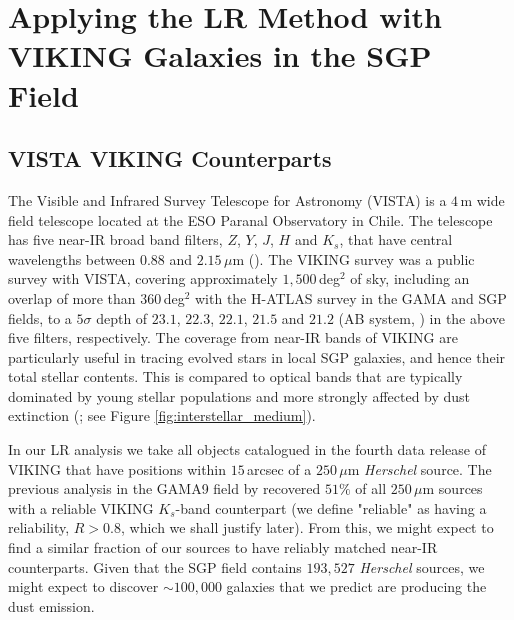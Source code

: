 \section{Applying the LR Method with VIKING Galaxies in the SGP Field}
\subsection{VISTA VIKING Counterparts}
\label{sec:star_galaxy_classifier}

The Visible and Infrared Survey Telescope for Astronomy (VISTA) is a $4\,$m wide field telescope located at the ESO Paranal Observatory in Chile. The telescope has five near-IR broad band filters, $Z$, $Y$, $J$, $H$ and $K_s$, that have central wavelengths between $0.88$ and $2.15\,\mu$m (\citealt{Emerson_2010}). The VIKING survey was a public survey with VISTA, covering approximately $1,500\,$deg$^2$ of sky, including an overlap of more than $360\,$deg$^2$ with the H-ATLAS survey in the GAMA and SGP fields, to a $5\sigma$ depth of $23.1$, $22.3$, $22.1$, $21.5$ and $21.2$ (AB system, \citealt{Edge_2013}) in the above five filters, respectively. The coverage from near-IR bands of VIKING are particularly useful in tracing evolved stars in local SGP galaxies, and hence their total stellar contents. This is compared to optical bands that are typically dominated by young stellar populations and more strongly affected by dust extinction (\citealt{Cole_2001}; see Figure \ref{fig:interstellar_medium}).

In our LR analysis we take all objects catalogued in the fourth data release of VIKING that have positions within $15\,$arcsec of a $250\,\mu$m \textit{Herschel} source. The previous analysis in the GAMA9 field by \citealt{Fleuren_2012} recovered $51\%$ of all $250\,\mu$m sources with a reliable VIKING $K_s$-band counterpart (we define "reliable" as having a reliability, $R > 0.8$, which we shall justify later). From this, we might expect to find a similar fraction of our sources to have reliably matched near-IR counterparts. Given that the SGP field contains $193,527$ \textit{Herschel} sources, we might expect to discover $\sim 100,000$ galaxies that we predict are producing the dust emission. 

